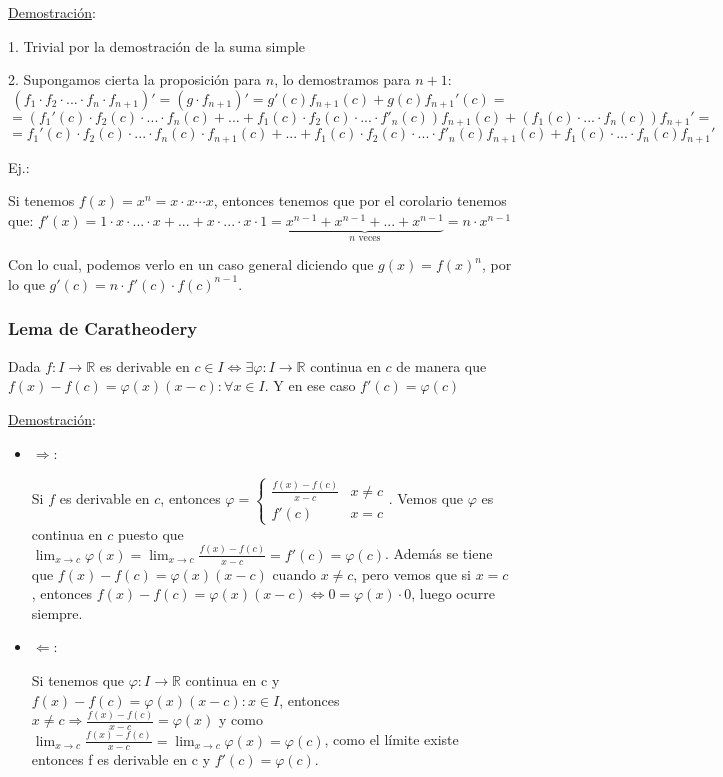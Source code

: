 \documentclass[10pt,a4paper,openright]{book}
\begin{document}
\underline{Demostración}:

1. Trivial por la demostración de la suma simple

2. Supongamos cierta la proposición para $n$, lo demostramos para $n+1$:
$$(f_1 \cdot f_2 \cdot ... \cdot f_n \cdot f_{n+1})'=(g\cdot f_{n+1})'= g'(c)f_{n+1}(c)+ g(c)f_{n+1}'(c) =$$
$$= \left(f_1'(c)\cdot f_2(c) \cdot ... \cdot f_n(c) +...+ f_1(c)\cdot f_2(c)\cdot ...\cdot f'_n(c)\right)f_{n+1}(c)+(f_1(c)\cdot ...\cdot f_n(c))f_{n+1}'= $$
$$=f_1'(c)\cdot f_2(c) \cdot ... \cdot f_n(c)\cdot f_{n+1}(c) +...+ f_1(c)\cdot f_2(c)\cdot ...\cdot f'_n(c)f_{n+1}(c)+f_1(c)\cdot ...\cdot f_n(c)f_{n+1}'$$


Ej.:

Si tenemos $f(x)=x^n= x\cdot x\cdots x$, entonces tenemos que por el corolario tenemos que: $f'(x)=1\cdot x \cdot ... \cdot x + ... + x\cdot ... \cdot x \cdot 1 = \underbrace{x^{n-1} + x^{n-1}+ ... + x^{n-1}}_{n \mbox{ veces}}= n\cdot x^{n-1}$

Con lo cual, podemos verlo en un caso general diciendo que $g(x)= f(x)^n$, por lo que $g'(c)= n\cdot f'(c)\cdot f(c)^{n-1}$.

\subsubsection*{Lema de Caratheodery}
Dada $f:I \rightarrow \mathbb R$ es derivable en $c\in I\Leftrightarrow\exists\varphi: I\rightarrow \mathbb R$ continua en $c$ de manera que $f(x)-f(c)=\varphi(x)(x-c): \forall x \in I$. Y en ese caso $f'(c)=\varphi(c)$

\underline{Demostración}:
\begin{itemize}
\item $\Rightarrow$:

Si $f$ es derivable en $c$, entonces $\varphi=\begin{cases} \frac{f(x)-f(c)}{x-c} & x\neq c \\ f'(c) & x=c\end{cases}$. Vemos que $\varphi$ es continua en $c$ puesto que $\lim_{x\rightarrow c}\varphi(x) = \lim_{x\rightarrow c} \frac{f(x)-f(c)}{x-c}=f'(c)=\varphi(c)$. Además se tiene que $f(x)-f(c)=\varphi(x)(x-c)$ cuando $x\neq c$, pero vemos que si $x=c$, entonces $f(x)-f(c)=\varphi(x)(x-c)\Leftrightarrow 0=\varphi(x)\cdot 0$, luego ocurre siempre.

\item $\Leftarrow$:

Si tenemos que $\varphi: I \rightarrow \mathbb R$ continua en c y $f(x)-f(c)=\varphi(x)(x-c) : x\in I$, entonces $x\neq c\Rightarrow \frac{f(x)-f(c)}{x-c}=\varphi(x)$ y como $\lim_{x\rightarrow c}\frac{f(x)-f(c)}{x-c} = \lim_{x\rightarrow c} \varphi(x)=\varphi(c)$, como el límite existe entonces f es derivable en c y $f'(c)=\varphi(c)$.
\end{itemize}
\end{document}
